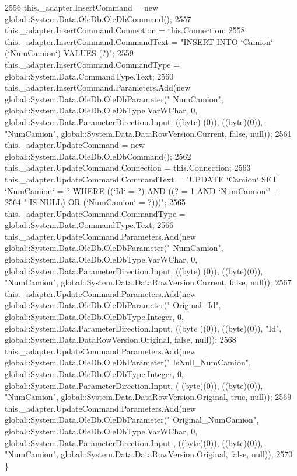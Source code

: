 \begin{DoxyCode}
2556             this.\_adapter.InsertCommand = \textcolor{keyword}{new} global::System.Data.OleDb.OleDbCommand();
2557             this.\_adapter.InsertCommand.Connection = this.Connection;
2558             this.\_adapter.InsertCommand.CommandText = \textcolor{stringliteral}{"INSERT INTO `Camion` (`NumCamion`) VALUES (?)"};
2559             this.\_adapter.InsertCommand.CommandType = global::System.Data.CommandType.Text;
2560             this.\_adapter.InsertCommand.Parameters.Add(\textcolor{keyword}{new} global::System.Data.OleDb.OleDbParameter(\textcolor{stringliteral}{"
      NumCamion"}, global::System.Data.OleDb.OleDbType.VarWChar, 0, global::System.Data.ParameterDirection.Input, ((byte)
      (0)), ((byte)(0)), \textcolor{stringliteral}{"NumCamion"}, global::System.Data.DataRowVersion.Current, \textcolor{keyword}{false}, null));
2561             this.\_adapter.UpdateCommand = \textcolor{keyword}{new} global::System.Data.OleDb.OleDbCommand();
2562             this.\_adapter.UpdateCommand.Connection = this.Connection;
2563             this.\_adapter.UpdateCommand.CommandText = \textcolor{stringliteral}{"UPDATE `Camion` SET `NumCamion` = ? WHERE ((`Id` =
       ?) AND ((? = 1 AND `NumCamion`"} +
2564                 \textcolor{stringliteral}{" IS NULL) OR (`NumCamion` = ?)))"};
2565             this.\_adapter.UpdateCommand.CommandType = global::System.Data.CommandType.Text;
2566             this.\_adapter.UpdateCommand.Parameters.Add(\textcolor{keyword}{new} global::System.Data.OleDb.OleDbParameter(\textcolor{stringliteral}{"
      NumCamion"}, global::System.Data.OleDb.OleDbType.VarWChar, 0, global::System.Data.ParameterDirection.Input, ((byte)
      (0)), ((byte)(0)), \textcolor{stringliteral}{"NumCamion"}, global::System.Data.DataRowVersion.Current, \textcolor{keyword}{false}, null));
2567             this.\_adapter.UpdateCommand.Parameters.Add(\textcolor{keyword}{new} global::System.Data.OleDb.OleDbParameter(\textcolor{stringliteral}{"
      Original\_Id"}, global::System.Data.OleDb.OleDbType.Integer, 0, global::System.Data.ParameterDirection.Input, ((byte
      )(0)), ((byte)(0)), \textcolor{stringliteral}{"Id"}, global::System.Data.DataRowVersion.Original, \textcolor{keyword}{false}, null));
2568             this.\_adapter.UpdateCommand.Parameters.Add(\textcolor{keyword}{new} global::System.Data.OleDb.OleDbParameter(\textcolor{stringliteral}{"
      IsNull\_NumCamion"}, global::System.Data.OleDb.OleDbType.Integer, 0, global::System.Data.ParameterDirection.Input, (
      (byte)(0)), ((byte)(0)), \textcolor{stringliteral}{"NumCamion"}, global::System.Data.DataRowVersion.Original, \textcolor{keyword}{true}, null));
2569             this.\_adapter.UpdateCommand.Parameters.Add(\textcolor{keyword}{new} global::System.Data.OleDb.OleDbParameter(\textcolor{stringliteral}{"
      Original\_NumCamion"}, global::System.Data.OleDb.OleDbType.VarWChar, 0, global::System.Data.ParameterDirection.Input
      , ((byte)(0)), ((byte)(0)), \textcolor{stringliteral}{"NumCamion"}, global::System.Data.DataRowVersion.Original, \textcolor{keyword}{false}, null));
2570         \}
\end{DoxyCode}
